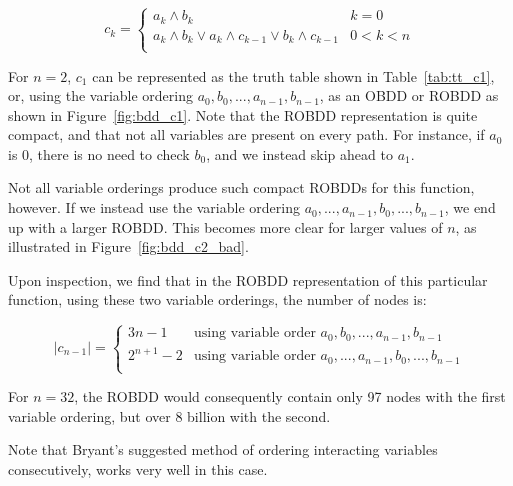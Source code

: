 \documentclass[a4paper,11pt]{kth-mag}
\newcommand{\AND}{\land}
\newcommand{\IOR}{\lor}
\begin{document}
$$
  c_k = \left\{
  \begin{array}{ll}
    a_k \AND b_k                                             & k = 0 \\
    a_k \AND b_k \IOR a_k \AND c_{k-1} \IOR b_k \AND c_{k-1} & 0 < k < n \\
  \end{array}\right.
$$

For $n = 2$, $c_1$ can be represented as the truth table shown in Table~\ref{tab:tt_c1}, or, using the variable ordering $a_0,b_0,...,a_{n-1},b_{n-1}$, as an OBDD or ROBDD as shown in Figure~\ref{fig:bdd_c1}.
Note that the ROBDD representation is quite compact, and that not all variables are present on every path.
For instance, if $a_0$ is 0, there is no need to check $b_0$, and we instead skip ahead to $a_1$.

Not all variable orderings produce such compact ROBDDs for this function, however.
If we instead use the variable ordering $a_0,...,a_{n-1},b_0,...,b_{n-1}$, we end up with a larger ROBDD.
This becomes more clear for larger values of $n$, as illustrated in Figure~\ref{fig:bdd_c2_bad}.

Upon inspection, we find that in the ROBDD representation of this particular function, using these two variable orderings, the number of nodes is:

$$
  |c_{n-1}| = \left\{
  \begin{array}{ll}
    3n-1      & \textrm{using variable order $a_0,b_0,...,a_{n-1},b_{n-1}$} \\
    2^{n+1}-2 & \textrm{using variable order $a_0,...,a_{n-1},b_0,...,b_{n-1}$} \\
  \end{array}\right.
$$

For $n = 32$, the ROBDD would consequently contain only 97 nodes with the first variable ordering, but over 8 billion with the second.

Note that Bryant's suggested method of ordering interacting variables consecutively, works very well in this case.
\end{document}
